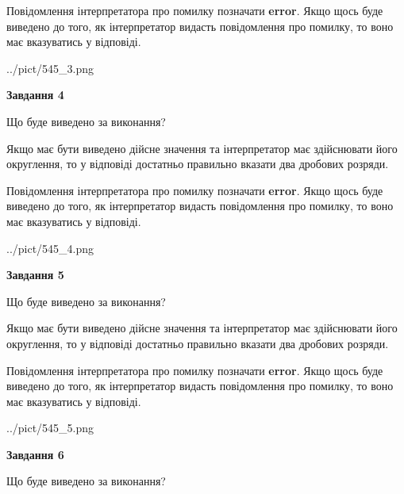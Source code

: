 \documentclass[12pt, ukrainian]{article}
\begin{document}
{\begin {Large}
Повідомлення інтерпретатора про помилку позначати \textbf{error}.
Якщо щось буде виведено до того, як інтерпретатор видасть повідомлення про помилку, 
то воно має вказуватись у відповіді. \par

\begin{center}
	{../pict/545_3.png}
\end{center}
\newpage

{\begin {center}\textbf{Завдання 4}\end {center}}\par
Що буде виведено за виконання? \par

Якщо має бути виведено дійсне значення та інтерпретатор має здійснювати його округлення, 
то у відповіді достатньо правильно вказати два дробових розряди.

Повідомлення інтерпретатора про помилку позначати \textbf{error}.
Якщо щось буде виведено до того, як інтерпретатор видасть повідомлення про помилку, 
то воно має вказуватись у відповіді. \par

\begin{center}
	{../pict/545_4.png}
\end{center}
\newpage

{\begin {center}\textbf{Завдання 5}\end {center}}\par
Що буде виведено за виконання? \par

Якщо має бути виведено дійсне значення та інтерпретатор має здійснювати його округлення, 
то у відповіді достатньо правильно вказати два дробових розряди.

Повідомлення інтерпретатора про помилку позначати \textbf{error}.
Якщо щось буде виведено до того, як інтерпретатор видасть повідомлення про помилку, 
то воно має вказуватись у відповіді. \par

\begin{center}
	{../pict/545_5.png}
\end{center}
\newpage

{\begin {center}\textbf{Завдання 6}\end {center}}\par
Що буде виведено за виконання? \par


\end{Large}}
\end{document}
